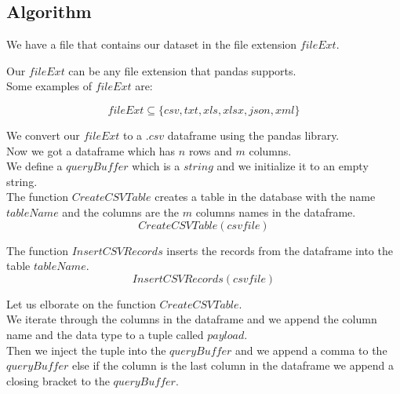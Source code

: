 \subsection{Algorithm}

We have a file that contains our dataset in the file extension $fileExt$.

Our $fileExt$ can be any file extension that pandas supports. \\

Some examples of $fileExt$ are:

\begin{equation}
    fileExt \subseteq \{csv, txt, xls, xlsx, json, xml\}
\end{equation}


We convert our $fileExt$ to a $.csv$ dataframe using the pandas library. \\

Now we got a dataframe which has $n$ rows and $m$ columns. \\

We define a $queryBuffer$ which is a $string$ and we initialize it to an empty string. \\

The function $CreateCSVTable$ creates a table in the database with the name $tableName$ and the columns are the $m$ columns names in the dataframe. \\

\begin{equation}
    CreateCSVTable(csvfile)
\end{equation}

The function $InsertCSVRecords$ inserts the records from the dataframe into the table $tableName$. \\

\begin{equation}
    InsertCSVRecords(csvfile)
\end{equation}

Let us elborate on the function $CreateCSVTable$. \\

We iterate through the columns in the dataframe and we append the column name and the data type to a tuple called $payload$. \\

Then we inject the tuple into the $queryBuffer$ and we append a comma to the $queryBuffer$ else if the column is the last column in the dataframe we append a closing bracket to the $queryBuffer$. \\

